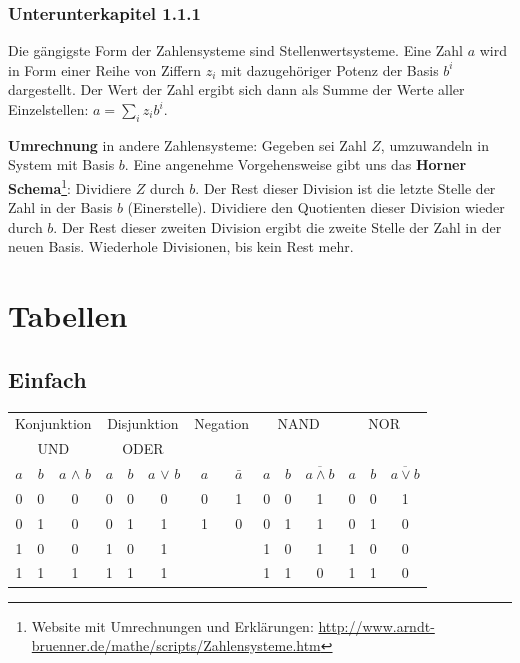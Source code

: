 \documentclass[12pt, a4paper, twopage]{scrartcl}
\begin{document}
\subsubsection{Unterunterkapitel 1.1.1}

%
%
Die gängigste Form der Zahlensysteme sind Stellenwertsysteme. Eine Zahl $a$ wird in Form einer Reihe von Ziffern $z_i$ mit dazugehöriger Potenz der Basis $b^i$ dargestellt. Der Wert der Zahl ergibt sich dann als Summe der Werte aller Einzelstellen: $a = \sum\limits_{i}z_ib^i$.

\textbf{Umrechnung} in andere Zahlensysteme: Gegeben sei Zahl $Z$, umzuwandeln in System mit Basis $b$.
Eine angenehme Vorgehensweise gibt uns das \textbf{Horner Schema}\footnote{
Website mit Umrechnungen und Erklärungen: \url{http://www.arndt-bruenner.de/mathe/scripts/Zahlensysteme.htm}
}: Dividiere $Z$ durch $b$. Der Rest dieser Division ist die letzte Stelle der Zahl in der Basis $b$  (Einerstelle). Dividiere den Quotienten dieser Division wieder durch $b$. Der Rest dieser zweiten Division ergibt die zweite Stelle der Zahl in der neuen Basis. Wiederhole Divisionen, bis kein Rest mehr.


\section{Tabellen}
\subsection{Einfach}
\begin{center}
\begin{tabular}[c]{c | c | c || c| c | c || c | c || c | c | c || c| c| c}
\multicolumn{3}{c||}{Konjunktion}	&	\multicolumn{3}{c||}{Disjunktion} & \multicolumn{2}{c||}{Negation} & \multicolumn{3}{c||}{NAND} & \multicolumn{3}{c}{NOR}\\
\multicolumn{3}{c||}{UND}	&	\multicolumn{3}{c||}{ODER} & \multicolumn{2}{c||}{} & \multicolumn{3}{c||}{} & \multicolumn{3}{c}{}\\
\hline
$a$ & $b$ & $a$ $\wedge$ $b$ & $a$ & $b$ & $a$ $\vee$ $b$ & $a$ & $\bar{a}$ & $a$ & $b$ & $\overline{a \wedge b}$ & $a$ & $b$ & $\overline{a \vee b}$\\
\hline
0 & 0 & 0 & 0 & 0 & 0 & 0 & 1 & 0 & 0 & 1 & 0 & 0 & 1\\
0 & 1 & 0 & 0 & 1 & 1 & 1 & 0 & 0 & 1 & 1 & 0 & 1 & 0\\
1 & 0 & 0 & 1 & 0 & 1 & & & 1 & 0 & 1 & 1 & 0 & 0\\
1 & 1 & 1 & 1 & 1 & 1 & & & 1 & 1 & 0 & 1 & 1 & 0\\
\hline
\end{tabular}
\end{center}
\end{document}
